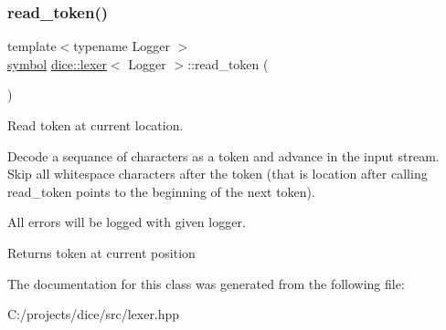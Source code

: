 \subsubsection{\texorpdfstring{read\+\_\+token()}{read\_token()}}
{\footnotesize\ttfamily template$<$typename Logger $>$ \\
\mbox{\hyperlink{structdice_1_1symbol}{symbol}} \mbox{\hyperlink{classdice_1_1lexer}{dice\+::lexer}}$<$ Logger $>$\+::read\+\_\+token (\begin{DoxyParamCaption}{ }\end{DoxyParamCaption})\hspace{0.3cm}{\ttfamily [inline]}}



Read token at current location. 

Decode a sequance of characters as a token and advance in the input stream. Skip all whitespace characters after the token (that is location after calling read\+\_\+token points to the beginning of the next token).

All errors will be logged with given logger.

\begin{DoxyReturn}{Returns}
token at current position 
\end{DoxyReturn}


The documentation for this class was generated from the following file\+:\begin{DoxyCompactItemize}
\item 
C\+:/projects/dice/src/lexer.\+hpp\end{DoxyCompactItemize}
